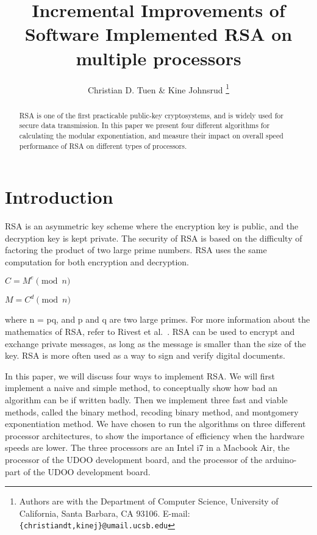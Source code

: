 \documentclass[twocolumn]{IEEEtran}
\begin{document}
\title{Incremental Improvements of Software Implemented RSA on multiple processors}


\author{Christian D. Tuen \& Kine Johnsrud
\thanks{Authors are with the
Department of Computer Science,
University of California, Santa Barbara, CA 93106.
E-mail: \texttt{\{christiandt,kinej\}@umail.ucsb.edu}}
}


\maketitle

\begin{abstract}
RSA is one of the first practicable public-key cryptosystems, and is widely used for secure data transmission. In this paper we present four different algorithms for calculating the modular exponentiation, and measure their impact on overall speed performance of RSA on different types of processors.
\end{abstract}

\section{Introduction}
RSA is an asymmetric key scheme where the encryption key is public, and the decryption key is kept private. The security of RSA is based on the difficulty of factoring the product of two large prime numbers. RSA uses the same computation for both encryption and decryption.

\bigskip

\centerline{$C = M^e \pmod{n}$}
\centerline{$M = C^d \pmod{n}$}

\bigskip

where n = pq, and p and q are two large primes. For more information about the mathematics of RSA, refer to Rivest et al.~\cite{rsa}. RSA can be used to encrypt and exchange private messages, as long as the message is smaller than the size of the key. RSA is more often used as a way to sign and verify digital documents. 

In this paper, we will discuss four ways to implement RSA. We will first implement a naive and simple method, to conceptually show how bad an algorithm can be if written badly. Then we implement three fast and viable methods, called the binary method, recoding binary method, and montgomery exponentiation method. We have chosen to run the algorithms on three different processor architectures, to show the importance of efficiency when the hardware speeds are lower. The three processors are an Intel i7 in a Macbook Air, the processor of the UDOO development board, and the processor of the arduino-part of the UDOO development board.
\end{document}

